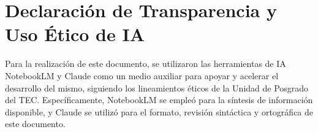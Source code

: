 \section*{Declaraci{\'o}n de Transparencia y Uso {\'E}tico de IA}
Para la realizaci{\'o}n de este documento, se utilizaron las herramientas de IA NotebookLM y Claude como un medio auxiliar para apoyar y acelerar el desarrollo del mismo, siguiendo los lineamientos {\'e}ticos de la Unidad de Posgrado del TEC. Espec{\'i}ficamente, NotebookLM se emple{\'o} para la s{\'i}ntesis de informaci{\'o}n disponible, y Claude se utiliz{\'o} para el formato, revisi{\'o}n sint{\'a}ctica y ortogr{\'a}fica de este documento.